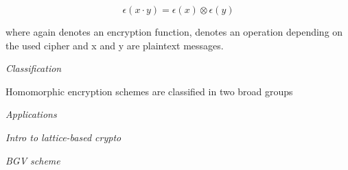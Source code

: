 \begin{equation}
\epsilon(x \cdot y) = \epsilon(x) \otimes \epsilon(y)
\end{equation}

where again \epsilon denotes an encryption function, \otimes denotes an operation depending on the used cipher and x and y are plaintext messages.

\textit{Classification}

Homomorphic encryption schemes are classified in two broad groups


\textit{Applications}

\textit{Intro to lattice-based crypto}

\textit{BGV scheme}



\clearpage
